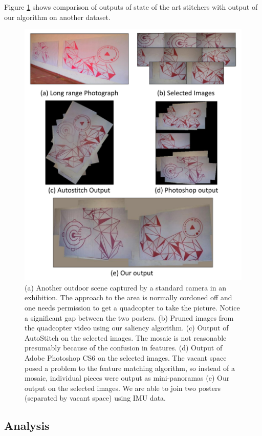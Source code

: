 Figure \ref{fig:results2} shows comparison of outputs of state of the art
stitchers with output of our algorithm on another dataset.

\begin{figure}[h!]
\centering
\includegraphics[width=0.8\linewidth]{figures/vacantSpaces/Purple_red} 
\caption[Result: Outdoor
Exhibition 2]{(a) Another outdoor
scene captured by a standard camera in an exhibition. The approach to the area is normally cordoned off and one
  needs permission to get a quadcopter to take the picture.  Notice a
  significant gap between the two posters.  (b) Pruned images from the
  quadcopter video using our saliency algorithm. (c) Output of
  AutoStitch on the selected images. The mosaic is not reasonable
  presumably because of the confusion in features. (d) Output of Adobe
  Photoshop CS6 on the selected images. The vacant space posed a
  problem to the feature matching algorithm, so instead of a mosaic,
  individual pieces were output as mini-panoramas (e) Our output on
  the selected images. We are able to join two posters (separated by
  vacant space) using IMU data.}
\label{fig:results2}
\end{figure}


\subsection{Analysis}

